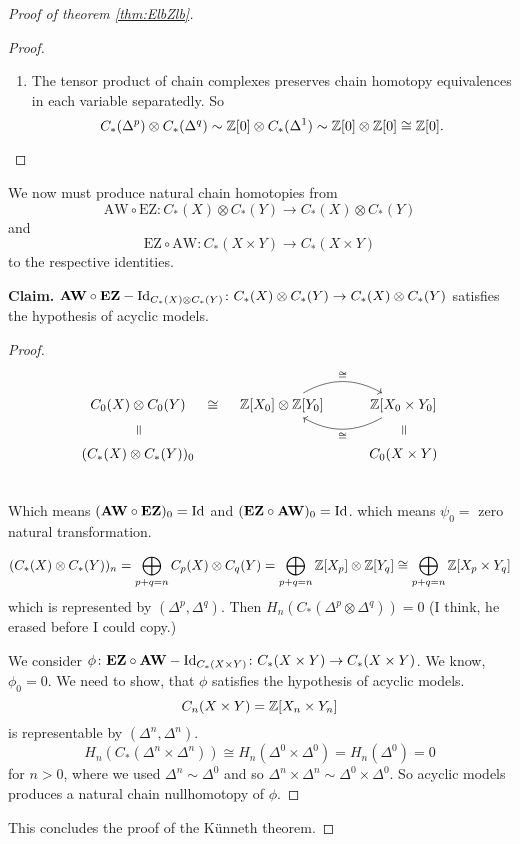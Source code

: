 \documentclass[language=english]{TemplateLecture}
\begin{document}
\begin{proof}[Proof of theorem \ref{thm:ElbZlb}]
\begin{proof}
\begin{enumerate}
            \item The tensor product of chain complexes preserves chain homotopy equivalences in each variable separatedly. So
            \[C_*(\Delta^p) \otimes C_*(\Delta^q) \sim \mathbb{Z}[0] \otimes C_*(\Delta^1) \sim \mathbb{Z}[0] \otimes \mathbb{Z}[0] \cong \mathbb{Z}[0].\]
        \end{enumerate}
    \end{proof}

    We now must produce natural chain homotopies from
    \[\mathrm{AW} \circ \mathrm{EZ} \colon C_*(X) \otimes C_*(Y) \to C_*(X) \otimes C_*(Y)\]
    and
    \[\mathrm{EZ} \circ \mathrm{AW}: C_*(X\times Y) \to C_*(X \times Y)\]
    to the respective identities.

    \textbf{Claim.} \(\mathbf{AW}\circ \mathbf{EZ} - \operatorname{Id}_{C_*(X) \otimes C_*(Y)}\colon C_*(X) \otimes C_*(Y) \to C_*(X) \otimes C_*(Y)\) satisfies the hypothesis of acyclic models.

    \begin{proof}
        \[\begin{tikzcd}
            C_0(X) \otimes C_0(Y) \ar[d, phantom, "=", sloped]\ar[r,"\cong", phantom] & \IZ[X_0] \otimes \IZ[Y_0] \ar[r, bend left, "\cong"] & \IZ[X_0 \times Y_0] \ar[l, bend left, "\cong"] \ar[d, "=", phantom, sloped]\\
            (C_*(X) \otimes C_*(Y))_0 && C_0(X\times Y)\\
        \end{tikzcd}\]
        Which means \((\mathbf{AW} \circ \mathbf{EZ})_0 = \operatorname{Id}\) and \((\mathbf{EZ} \circ \mathbf{AW})_0 = \operatorname{Id}\). which means \(\psi_0 = \) zero natural transformation.

        \[(C_*(X) \otimes C_*(Y))_n = \bigoplus_{p+q = n} C_p(X) \otimes C_q(Y) = \bigoplus_{p+q = n} \mathbb{Z}[X_p] \otimes \mathbb{Z}[Y_q] \cong \bigoplus_{p+q = n} \mathbb{Z}[X_p \times Y_q]\]
        which is represented by \((\Delta^p, \Delta^q)\). Then
        \(H_n(C_*(\Delta^p \otimes \Delta^q)) = 0\) (I think, he erased before I could copy.)

        We consider \(\phi \colon \mathbf{EZ} \circ \mathbf{AW} - \operatorname{Id}_{C_*(X\times Y)} \colon C_*(X\times Y) \to C_*(X\times Y)\). We know, \(\phi_0 = 0\). We need to show, that \(\phi\) satisfies the hypothesis of acyclic models.
        \[C_n(X\times Y) = \mathbb{Z}[X_n \times Y_n]\]
        is representable by \((\Delta^n, \Delta^n)\).
        \[H_n(C_*(\Delta^n\times \Delta^n)) \cong H_n(\Delta^0 \times \Delta^0) = H_n(\Delta^0) = 0\]
        for \(n > 0\), where we used \(\Delta^n \sim \Delta^0\) and so \(\Delta^n \times \Delta^n \sim \Delta^0 \times \Delta^0\). So acyclic models produces a natural chain nullhomotopy of \(\phi\).
    \end{proof}

    This concludes the proof of the Künneth theorem.
\end{proof}
\end{document}

